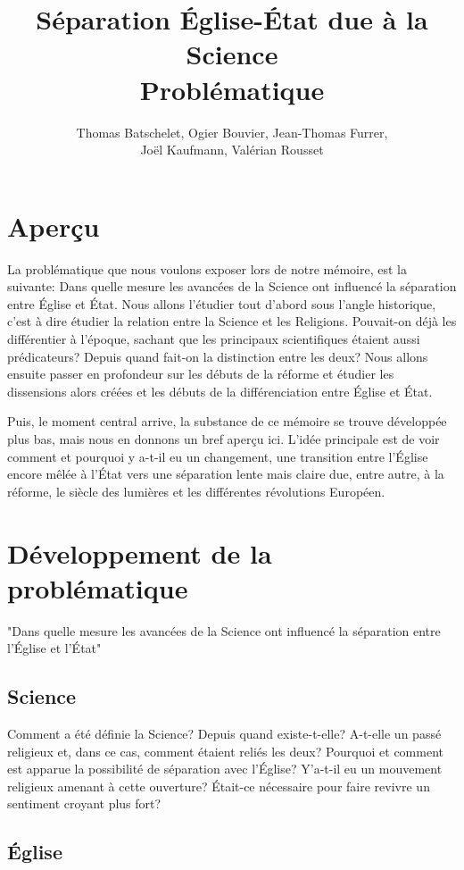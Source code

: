 \documentclass{article}
\title{Séparation Église-État due à la Science \\
	\large{Problématique}}
\author{Thomas Batschelet, Ogier Bouvier, Jean-Thomas Furrer, \\ Joël Kaufmann, Valérian Rousset}
\begin{document}
\maketitle

\section{Aperçu}

La problématique que nous voulons exposer lors de notre mémoire, est la
suivante: Dans quelle mesure les avancées de la Science ont influencé la séparation
entre Église et État. Nous allons l'étudier tout d'abord sous l'angle
historique, c'est à dire étudier la relation entre la Science et les Religions.
Pouvait-on déjà les différentier à l'époque, sachant que les principaux scientifiques
étaient aussi prédicateurs? Depuis quand fait-on la distinction entre les deux?
Nous allons ensuite passer en profondeur sur les débuts de la réforme et étudier les dissensions
alors créées et les débuts de la différenciation entre Église et État.

Puis, le moment central arrive, la substance de ce mémoire se trouve développée
plus bas, mais nous en donnons un bref aperçu ici. L'idée principale est de voir
comment et pourquoi y a-t-il eu un changement, une transition entre l'Église
encore mêlée à l'État vers une séparation lente mais claire due, entre autre, à la
réforme, le siècle des lumières et les différentes révolutions Européen.

\section{Développement de la problématique}

"Dans quelle mesure les avancées de la Science ont influencé la séparation
entre l'Église et l'État"

\subsection{Science}

Comment a été définie la Science? Depuis quand existe-t-elle? A-t-elle un passé
religieux et, dans ce cas, comment étaient reliés les deux? Pourquoi et comment
est apparue la possibilité de séparation avec l'Église? Y'a-t-il eu un mouvement
religieux amenant à cette ouverture? Était-ce nécessaire pour faire revivre un
sentiment croyant plus fort?

\subsection{Église}
\end{document}
